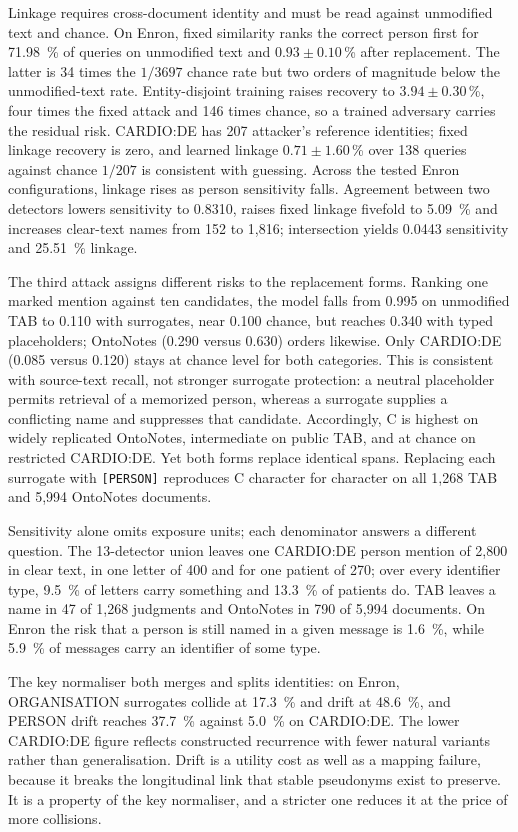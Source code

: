 Linkage requires cross-document identity and must be read against unmodified text and chance. On
Enron, fixed similarity ranks the correct person first for \SI{71.98}{\percent} of queries on unmodified
text and $0.93\pm0.10$\,\% after replacement. The latter is 34 times the $1/3697$ chance rate
but two orders of magnitude below the unmodified-text rate. Entity-disjoint training raises recovery to
$3.94\pm0.30$\,\%, four times the fixed attack and 146 times chance, so a trained adversary carries
the residual risk. CARDIO:DE has 207 attacker's reference identities; fixed linkage recovery is zero, and
learned linkage $0.71\pm1.60$\,\% over 138 queries against chance $1/207$ is consistent with
guessing.
Across the tested Enron configurations, linkage rises as person sensitivity falls. Agreement
between two detectors lowers sensitivity to 0.8310, raises fixed linkage fivefold to \SI{5.09}{\percent} and
increases clear-text names from 152 to 1,816; intersection yields 0.0443 sensitivity and \SI{25.51}{\percent}
linkage.

The third attack assigns different risks to the replacement forms. Ranking one marked mention against ten candidates, the model falls from 0.995 on unmodified TAB to 0.110 with surrogates, near 0.100 chance, but reaches 0.340 with typed placeholders; OntoNotes (0.290 versus 0.630) orders likewise. Only CARDIO:DE (0.085 versus 0.120) stays at chance level for both categories. This is consistent with source-text recall, not stronger surrogate protection: a neutral placeholder permits retrieval of a memorized person, whereas a surrogate supplies a conflicting name and suppresses that candidate. Accordingly, C is highest on widely replicated OntoNotes, intermediate on public TAB, and at chance on restricted CARDIO:DE. Yet both forms replace identical spans. Replacing each surrogate with \texttt{[PERSON]} reproduces C character for character on all 1,268 TAB and 5,994 OntoNotes documents. 

Sensitivity alone omits exposure units; each denominator answers a different question. The
13-detector union leaves one CARDIO:DE person mention of 2,800 in clear text, in one letter of 400
and for one patient of 270; over every identifier type, \SI{9.5}{\percent} of letters carry
something and \SI{13.3}{\percent} of patients do. TAB leaves a name in 47 of 1,268 judgments and
OntoNotes in 790 of 5,994 documents. On Enron the risk that a person is still named in a given
message is \SI{1.6}{\percent}, while \SI{5.9}{\percent} of messages carry an identifier of some
type.

\label{sec:results-stability}%
The key normaliser both merges and splits identities: on Enron, ORGANISATION surrogates collide at
\SI{17.3}{\percent} and drift at \SI{48.6}{\percent}, and PERSON drift reaches \SI{37.7}{\percent}
against \SI{5.0}{\percent} on CARDIO:DE. The lower CARDIO:DE figure reflects constructed recurrence
with fewer natural variants rather than generalisation. Drift is a utility cost as well as a mapping
failure, because it breaks the longitudinal link that stable pseudonyms exist to preserve. It is a
property of the key normaliser, and a stricter one reduces it at the price of more collisions.
